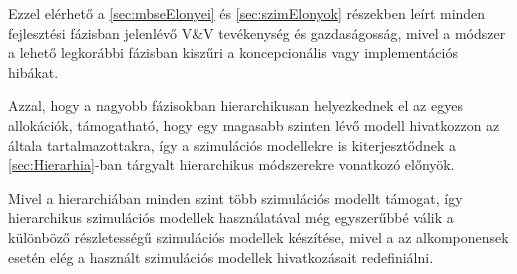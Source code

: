         Ezzel elérhető a \ref{sec:mbseElonyei} és \ref{sec:szimElonyok} részekben leírt minden fejlesztési fázisban jelenlévő V\&V tevékenység és gazdaságosság, mivel a módszer a lehető legkorábbi fázisban kiszűri a koncepcionális vagy implementációs hibákat.

        Azzal, hogy a nagyobb fázisokban hierarchikusan helyezkednek el az egyes allokációk, támogatható, hogy egy magasabb szinten lévő modell hivatkozzon az általa tartalmazottakra, így a szimulációs modellekre is kiterjesztődnek a \ref{sec:Hierarhia}-ban tárgyalt hierarchikus módszerekre vonatkozó előnyök.
        
        Mivel a hierarchiában minden szint több szimulációs modellt támogat, így hierarchikus szimulációs modellek használatával még egyszerűbbé válik a különböző részletességű szimulációs modellek készítése, mivel a az alkomponensek esetén elég a használt szimulációs modellek hivatkozásait redefiniálni.
